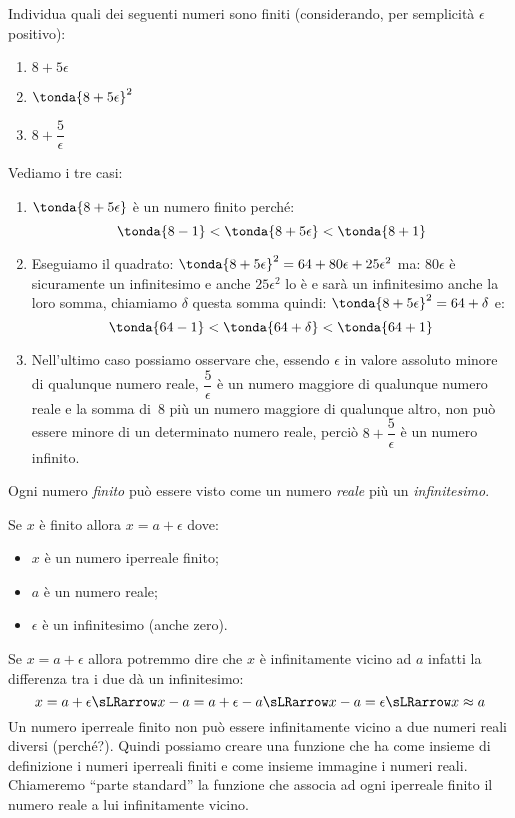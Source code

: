 \begin{esempio}
 Individua quali dei seguenti numeri sono finiti (considerando, per 
semplicità \(\epsilon\) positivo):

\begin{multicols}{3}
\begin{enumerate}
 \item \(8+5\epsilon\)
 \item \(\tonda{8+5\epsilon}^2\)
 \item \(8+\dfrac{5}{\epsilon}\)
\end{enumerate}
\end{multicols}

Vediamo i tre casi:

\begin{enumerate}
 \item \(\tonda{8+5\epsilon}\) è un numero finito perché:
 \[\tonda{8-1} < \tonda{8+5\epsilon} < \tonda{8+1}\]
 \item Eseguiamo il quadrato:
 \(\tonda{8+5\epsilon}^2 = 64 +80 \epsilon +25 \epsilon^2\)
 ma: \(80 \epsilon\) è sicuramente un infinitesimo e anche \(25 \epsilon^2\)
 lo è e sarà un infinitesimo anche la loro somma, chiamiamo \(\delta\) 
questa somma quindi: 
\(\tonda{8+5\epsilon}^2 = 64 + \delta\)
e: 
\[\tonda{64 -1} < \tonda{64 + \delta} < \tonda{64 +1}\]
 \item Nell'ultimo caso possiamo osservare che, essendo \(\epsilon\) in 
valore assoluto minore di qualunque numero reale, 
 \(\dfrac{5}{\epsilon}\) è un numero maggiore di qualunque numero reale e 
la somma di~8 più un numero maggiore di qualunque altro, non può essere 
minore di un determinato numero reale, 
perciò \(8+\dfrac{5}{\epsilon}\) è un numero infinito.
\end{enumerate}
\end{esempio}

\noindent Ogni numero \emph{finito} può essere visto come un numero 
\emph{reale} più un \emph{infinitesimo}.

Se \(x\) è finito allora \(x = a + \epsilon\) dove:
\begin{itemize} [noitemsep]
 \item \(x\) è un numero iperreale finito;
 \item \(a\) è un numero reale;
 \item \(\epsilon\) è un infinitesimo (anche zero).
\end{itemize}

Se \(x=a+\epsilon\) allora potremmo dire che \(x\) è infinitamente vicino 
ad \(a\) infatti la differenza tra i due dà un infinitesimo: 
\[x=a+\epsilon \sLRarrow
x-a = a+\epsilon-a \sLRarrow x-a = \epsilon \sLRarrow x \approx a\]
Un numero iperreale finito non può essere infinitamente vicino 
a due numeri reali diversi (perché?).
Quindi possiamo creare una funzione che ha come insieme di definizione 
i numeri iperreali finiti e come insieme immagine i numeri reali.
Chiameremo ``parte standard'' la funzione che associa ad ogni 
iperreale finito il numero reale a lui infinitamente vicino.

